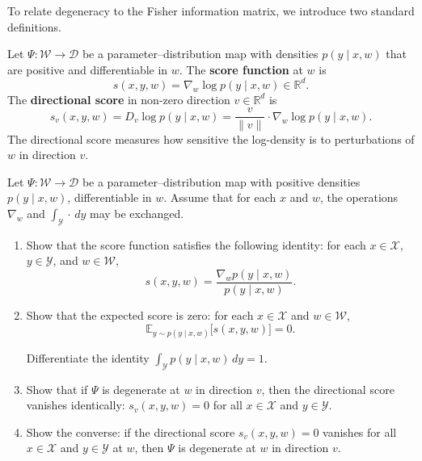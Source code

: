 \documentclass[11pt]{article}
\newcommand{\R}{\mathbb{R}}
\newcommand{\E}{\mathbb{E}}
\newcommand{\X}{\mathcal{X}}
\newcommand{\Y}{\mathcal{Y}}
\newcommand{\W}{\mathcal{W}}
\newcommand{\D}{\mathcal{D}}
\begin{document}
To relate degeneracy to the Fisher information matrix, we introduce two
standard definitions.

\begin{definition}
\label{def:score}
    Let $\Psi : \W \to \D$ be a parameter--distribution map with densities
    $p(y \mid x, w)$ that are positive and differentiable in $w$.
    The \textbf{score function} at $w$ is
    \begin{equation}\label{eq:score}
        s(x, y, w) = \nabla_w \log p(y \mid x, w) \in \R^d.
    \end{equation}
    The \textbf{directional score} in non-zero direction $v \in \R^d$ is
    \begin{equation}\label{eq:directional-score}
        s_v(x, y, w)
        = D_v \log p(y \mid x, w)
        = \frac{v}{\|v\|} \cdot \nabla_w \log p(y \mid x, w).
    \end{equation}
    The directional score measures how sensitive the log-density is to
    perturbations of $w$ in direction $v$.
\end{definition}

\begin{exercise}
\label{ex:score-properties}
    Let $\Psi : \W \to \D$ be a parameter--distribution map with positive
    densities $p(y \mid x, w)$, differentiable in $w$. Assume that for
    each $x$ and $w$, the operations $\nabla_w$ and
    $\int_\Y \cdot\, dy$ may be exchanged.
\begin{enumerate}
    \item
        Show that the score function satisfies the following identity:
        for each $x \in \X$, $y \in \Y$, and $w \in \W$,
        \begin{equation}\label{eq:score-identity}
            s(x,y,w) = \frac{\nabla_w p(y \mid x,w)}{p(y \mid x,w)}.
        \end{equation}
    \item
        Show that the expected score is zero: for each $x \in \X$ and
        $w \in \W$,
        \begin{equation}
            \E_{y \sim p(y \mid x, w)}\bigl[s(x, y, w)\bigr] = 0.
        \end{equation}
        \begin{hint}
Differentiate the identity
            $\int_\Y p(y \mid x, w) \, dy = 1$.
        \end{hint}
    \item\label{ex:score-properties:b}
        Show that if $\Psi$ is degenerate at $w$ in direction $v$, then
        the directional score vanishes identically:
            $s_v(x, y, w) = 0$
        for all $x \in \X$ and $y \in \Y$.
    \item\label{ex:score-properties:c}
        Show the converse: if the directional score $s_v(x, y, w) = 0$
        vanishes for all $x \in \X$ and $y \in \Y$ at $w$, then $\Psi$ is
        degenerate at $w$ in direction $v$.
\end{enumerate}
\end{exercise}
\end{document}
